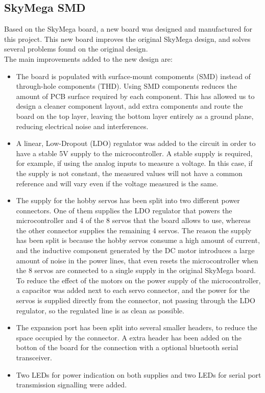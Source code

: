 \subsection{SkyMega SMD}
\label{hardware_electronics_skymegaSMD}

Based on the SkyMega board, a new board was designed and manufactured for this project. This new board improves the original SkyMega design, and solves several problems found on the original design.\\

The main improvements added to the new design are:
\begin{itemize}
	\item The board is populated with surface-mount compoments (SMD) instead of through-hole components (THD). Using SMD components reduces the amount of PCB surface required by each component. This has allowed us to design a cleaner component layout, add extra components and route the board on the top layer, leaving the bottom layer entirely as a ground plane, reducing electrical noise and interferences.
	
	\item A linear, Low-Dropout (LDO) regulator was added to the circuit in order to have a stable 5V supply to the microcontroller. A stable supply is required, for example, if using the analog inputs to measure a voltage. In this case, if the supply is not constant, the measured values will not have a common reference and will vary even if the voltage measured is the same.
	
	\item The supply for the hobby servos has been split into two different power connectors. One of them supplies the LDO regulator that powers the microcontroller and 4 of the 8 servos that the board allows to use, whereas the other connector supplies the remaining 4 servos. The reason the supply has been split is because the hobby servos consume a high amount of current, and the inductive component generated by the DC motor introduces a large amount of noise in the power lines, that even resets the microcontroller when the 8 servos are connected to a single supply in the original SkyMega board. To reduce the effect of the motors on the power supply of the microcontroller,  a capacitor was added next to each servo connector, and the power for the servos is supplied directly from the connector, not passing through the LDO regulator, so the regulated line is as clean as possible.
	
	\item The expansion port has been split into several smaller headers, to reduce the space occupied by the connector. A extra header has been added on the botton of the board for the connection with a optional bluetooth serial transceiver.
	
	\item Two LEDs for power indication on both supplies and two LEDs for serial port transmission signalling were added.
\end{itemize}

